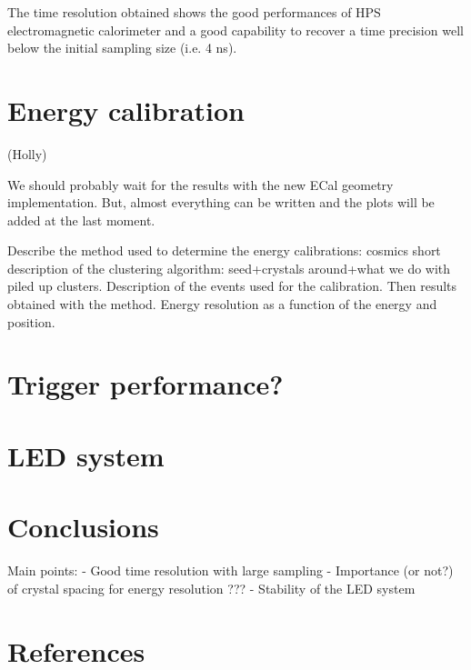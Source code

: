 \documentclass[review]{elsarticle}
\begin{document}
The time resolution obtained shows the good performances of HPS electromagnetic 
calorimeter and a good capability to recover a time
precision well below the initial sampling size (i.e. 4 ns).

\section{Energy calibration}
(Holly)

We should probably wait for the results with the new ECal geometry 
implementation. But, almost everything can be written and the plots will be 
added at the last moment.

Describe the method used to determine the energy calibrations: 
cosmics 
short description of the clustering algorithm: seed+crystals around+what we do with piled up clusters.
Description of the events used for the calibration.
Then results obtained with the method. Energy resolution as a function of the energy and position. 

\section{Trigger performance?}

\section{LED system}

\section{Conclusions}

Main points:
 - Good time resolution with large sampling
 - Importance (or not?) of crystal spacing for energy resolution ???
 - Stability of the LED system

\section*{References}




\end{document}
